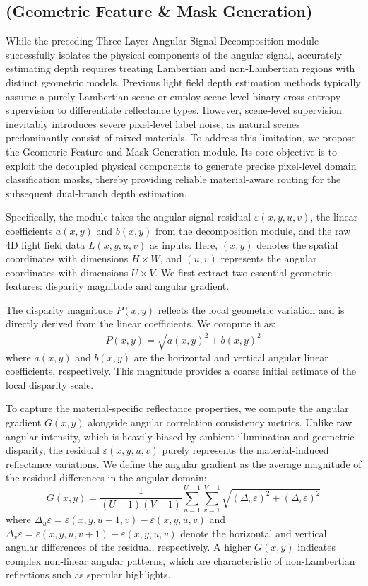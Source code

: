 \subsection{(Geometric Feature \& Mask Generation)}

While the preceding Three-Layer Angular Signal Decomposition module successfully isolates the physical components of the angular signal, accurately estimating depth requires treating Lambertian and non-Lambertian regions with distinct geometric models. Previous light field depth estimation methods typically assume a purely Lambertian scene or employ scene-level binary cross-entropy supervision to differentiate reflectance types. However, scene-level supervision inevitably introduces severe pixel-level label noise, as natural scenes predominantly consist of mixed materials. To address this limitation, we propose the Geometric Feature and Mask Generation module. Its core objective is to exploit the decoupled physical components to generate precise pixel-level domain classification masks, thereby providing reliable material-aware routing for the subsequent dual-branch depth estimation.

Specifically, the module takes the angular signal residual $\varepsilon(x,y,u,v)$, the linear coefficients $a(x,y)$ and $b(x,y)$ from the decomposition module, and the raw 4D light field data $L(x,y,u,v)$ as inputs. Here, $(x,y)$ denotes the spatial coordinates with dimensions $H \times W$, and $(u,v)$ represents the angular coordinates with dimensions $U \times V$. We first extract two essential geometric features: disparity magnitude and angular gradient.

The disparity magnitude $P(x,y)$ reflects the local geometric variation and is directly derived from the linear coefficients. We compute it as:
\begin{equation}
\label{eq:eq5}
P(x,y) = \sqrt{a(x,y)^2 + b(x,y)^2}
\end{equation}
where $a(x,y)$ and $b(x,y)$ are the horizontal and vertical angular linear coefficients, respectively. This magnitude provides a coarse initial estimate of the local disparity scale.

To capture the material-specific reflectance properties, we compute the angular gradient $G(x,y)$ alongside angular correlation consistency metrics. Unlike raw angular intensity, which is heavily biased by ambient illumination and geometric disparity, the residual $\varepsilon(x,y,u,v)$ purely represents the material-induced reflectance variations. We define the angular gradient as the average magnitude of the residual differences in the angular domain:
\begin{equation}
\label{eq:eq6}
G(x,y) = \frac{1}{(U-1)(V-1)} \sum_{u=1}^{U-1} \sum_{v=1}^{V-1} \sqrt{(\Delta_u \varepsilon)^2 + (\Delta_v \varepsilon)^2}
\end{equation}
where $\Delta_u \varepsilon = \varepsilon(x,y,u+1,v) - \varepsilon(x,y,u,v)$ and $\Delta_v \varepsilon = \varepsilon(x,y,u,v+1) - \varepsilon(x,y,u,v)$ denote the horizontal and vertical angular differences of the residual, respectively. A higher $G(x,y)$ indicates complex non-linear angular patterns, which are characteristic of non-Lambertian reflections such as specular highlights.

